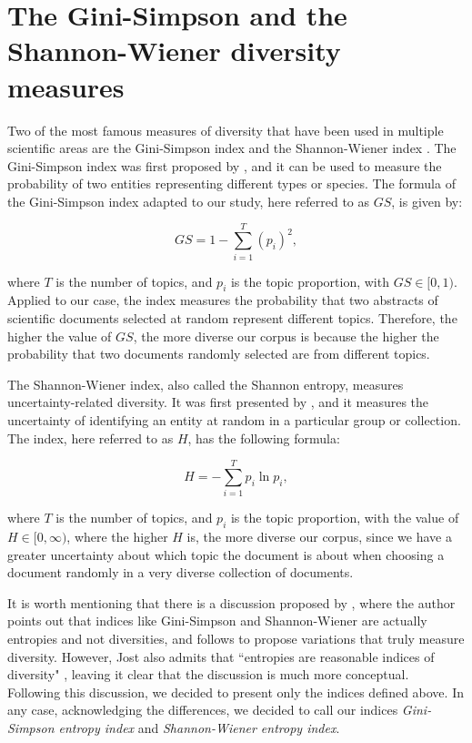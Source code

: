 \section{The Gini-Simpson and the Shannon-Wiener diversity measures} \label{diversity_indices}

Two of the most famous measures of diversity that have been used in multiple scientific areas are the Gini-Simpson index and the Shannon-Wiener index \citep{jost_entropy_2006}. The Gini-Simpson index was first proposed by \cite{simpson_measurement_1949}, and it can be used to measure the probability of two entities representing different types or species. The formula of the Gini-Simpson index adapted to our study, here referred to as $GS$, is given by:

\begin{equation}
GS = 1 - \sum^{T}_{i = 1} (p_{i})^{2},
\label{gs_entropy}
\end{equation}

\noindent where $T$ is the number of topics, and $p_{i}$ is the topic proportion, with $GS \in [0,1)$. Applied to our case, the index measures the probability that two abstracts of scientific documents selected at random represent different topics. Therefore, the higher the value of $GS$, the more diverse our corpus is because the higher the probability that two documents randomly selected are from different topics.

The Shannon-Wiener index, also called the Shannon entropy, measures uncertainty-related diversity. It was first presented by \cite{shannon_mathematical_1948}, and it measures the uncertainty of identifying an entity at random in a particular group or collection. The index, here referred to as $H$, has the following formula:

\begin{equation}
H = - \sum^{T}_{i = 1} p_{i} \ln{p_{i}},
\label{h_entropy}
\end{equation}

\noindent where $T$ is the number of topics, and $p_{i}$ is the topic proportion, with the value of $H \in [0, \infty)$, where the higher $H$ is, the more diverse our corpus, since we have a greater uncertainty about which topic the document is about when choosing a document randomly in a very diverse collection of documents.

It is worth mentioning that there is a discussion proposed by \cite{jost_entropy_2006}, where the author points out that indices like Gini-Simpson and Shannon-Wiener are actually entropies and not diversities, and follows to propose variations that truly measure diversity. However, Jost also admits that ``entropies are reasonable indices of diversity" \citep[p. 363]{jost_entropy_2006}, leaving it clear that the discussion is much more conceptual. Following this discussion, we decided to present only the indices defined above. In any case, acknowledging the differences, we decided to call our indices \textit{Gini-Simpson entropy index} and \textit{Shannon-Wiener entropy index}.